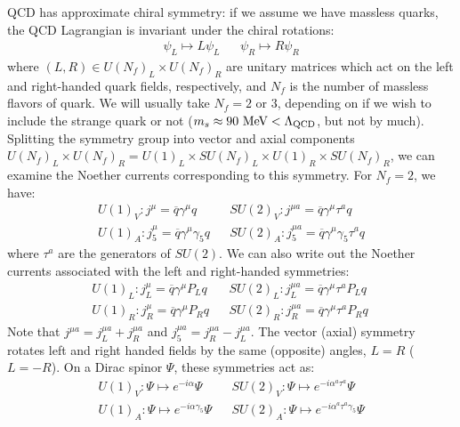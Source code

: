 \documentclass[11pt, oneside]{article}   	%
\theoremstyle{definition}
\numberwithin{equation}{subsection}		%
\begin{document}
QCD has approximate chiral symmetry: if we assume we have massless quarks, the QCD Lagrangian is invariant under 
the chiral rotations:
\begin{align}
	\psi_L\mapsto L\psi_L && \psi_R\mapsto R\psi_R
\end{align}
where $(L, R)\in U(N_f)_L\times U(N_f)_R$ are unitary matrices which act on the left and right-handed quark fields, respectively, and 
$N_f$ is the number of massless flavors of quark. We will usually take $N_f = 2$ or $3$, depending on if we wish to include the 
strange quark or not ($m_s \approx 90 \textnormal{ MeV} < \Lambda_\mathrm{QCD}$, but not by much). 
Splitting the symmetry group into vector and axial components $U(N_f)_L\times U(N_f)_R = U(1)_L\times SU(N_f)_L\times U(1)_R\times 
SU(N_f)_R$, we can examine the Noether currents corresponding to this symmetry. For $N_f = 2$, we have:
\begin{align}
	U(1)_V : j^\mu = \overline q\gamma^\mu q && SU(2)_V : j^{\mu a} = \overline q \gamma^\mu \tau^a q \nonumber \\
	U(1)_A : j_5^\mu = \overline q \gamma^\mu\gamma_5 q  && SU(2)_A : j_5^{\mu a} = \overline q \gamma^\mu \gamma_5 \tau^a q
\end{align}
where $\tau^a$ are the generators of $SU(2)$. We can also write out the Noether currents associated with the left and right-handed 
symmetries:
\begin{align}
	U(1)_L : j_L^\mu = \overline q \gamma^\mu P_L q && SU(2)_L : j_L^{\mu a} = \overline q \gamma^\mu \tau^a P_L q \nonumber \\
	U(1)_R : j_R^\mu = \overline q \gamma^\mu P_R q  && SU(2)_R : j_R^{\mu a} = \overline q \gamma^\mu \tau^a P_R q ~
	\label{eq:chiral_currents}
\end{align}
Note that $j^{\mu a} = j_L^{\mu a} + j_R^{\mu a}$ and $j_5^{\mu a} = j_R^{\mu a} - j_L^{\mu a}$. The vector (axial) symmetry rotates left and 
right handed fields by the same (opposite) angles, $L = R$ ($L = -R$). On a Dirac spinor $\Psi$, these symmetries act as:
\begin{align}
	U(1)_V : \Psi\mapsto e^{-i\alpha}\Psi && SU(2)_V : \Psi\mapsto e^{-i\alpha^a\tau^a}\Psi \nonumber \\
	U(1)_A : \Psi\mapsto e^{-i\alpha\gamma_5}\Psi  && SU(2)_A : \Psi\mapsto e^{-i\alpha^a\tau^a\gamma_5}\Psi	
\end{align}
\end{document}
